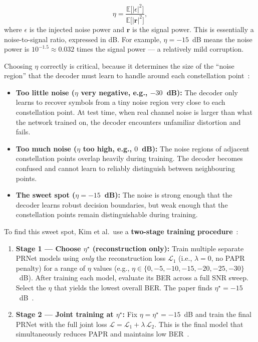 \begin{equation}
    \eta = \frac{\mathbb{E}\bigl[|\epsilon|^2\bigr]}
                {\mathbb{E}\bigl[|\bm{r}|^2\bigr]},
    \label{eq:prnet_eta}
\end{equation}
where $\epsilon$ is the injected noise power and $\bm{r}$ is the signal
power.  This is essentially a noise-to-signal ratio, expressed in dB.
For example, $\eta = -15$~dB means the noise power is
$10^{-1.5} \approx 0.032$ times the signal power --- a relatively
mild corruption.

Choosing $\eta$ correctly is critical, because it determines the size of
the ``noise region'' that the decoder must learn to handle around each
constellation point~\cite{kim2017novel}:

\begin{itemize}
    \item \textbf{Too little noise ($\eta$ very negative, e.g., $-30$~dB):}
          The decoder only learns to recover symbols from a tiny noise
          region very close to each constellation point.  At test time,
          when real channel noise is larger than what the network trained
          on, the decoder encounters unfamiliar distortion and fails.

    \item \textbf{Too much noise ($\eta$ too high, e.g., $0$~dB):}
          The noise regions of adjacent constellation points overlap
          heavily during training.  The decoder becomes confused and cannot
          learn to reliably distinguish between neighbouring points.

    \item \textbf{The sweet spot ($\eta = -15$~dB):} The noise is strong
          enough that the decoder learns robust decision boundaries, but
          weak enough that the constellation points remain distinguishable
          during training.
\end{itemize}

To find this sweet spot, Kim et al.\ use a \textbf{two-stage training
procedure}~\cite{kim2017novel}:

\begin{enumerate}
    \item \textbf{Stage 1 --- Choose $\eta^\star$ (reconstruction only):}
          Train multiple separate PRNet models using \emph{only} the
          reconstruction loss $\mathcal{L}_1$ (i.e., $\lambda = 0$, no
          PAPR penalty) for a range of $\eta$ values
          (e.g., $\eta \in \{0, -5, -10, -15, -20, -25, -30\}$~dB).
          After training each model, evaluate its BER across a full SNR
          sweep.  Select the $\eta$ that yields the lowest overall BER.
          The paper finds $\eta^\star = -15$~dB~\cite{kim2017novel}.

    \item \textbf{Stage 2 --- Joint training at $\eta^\star$:}
          Fix $\eta = \eta^\star = -15$~dB and train the final PRNet with
          the full joint loss
          $\mathcal{L} = \mathcal{L}_1 + \lambda\,\mathcal{L}_2$.
          This is the final model that simultaneously reduces PAPR
          and maintains low BER~\cite{kim2017novel}.
\end{enumerate}

